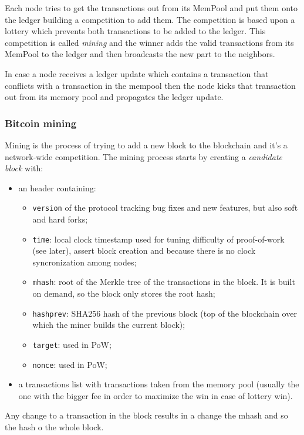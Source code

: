 Each node tries to get the transactions out from its MemPool and put them onto the ledger building a competition to add them.
The competition is based upon a lottery which prevents both transactions to be added to the ledger.
This competition is called \emph{mining} and the winner adds the valid transactions from its MemPool to the ledger and then broadcasts the new part to the neighbors. 

In case a node receives a ledger update which contains a transaction that conflicts with a transaction in the mempool then the node kicks that transaction out from its memory pool and propagates the ledger update.

\subsubsection{Bitcoin mining}
Mining is the process of trying to add a new block to the blockchain and it's a network-wide competition.
The mining process starts by creating a \emph{candidate block} with:
\begin{itemize}
    \item an header containing:
    \begin{itemize}
        \item \verb|version| of the protocol tracking bug fixes and new features, but also soft and hard forks;
        
        \item \verb|time|: local clock timestamp used for tuning difficulty of proof-of-work (see later), assert block creation and because there is no clock syncronization among nodes;
        
        \item \verb|mhash|: root of the Merkle tree of the transactions in the block.
        It is built on demand, so the block only stores the root hash;

        \item \verb|hashprev|: SHA256 hash of the previous block (top of the blockchain over which the miner builds the current block);

        \item \verb|target|: used in PoW;

        \item \verb|nonce|: used in PoW;
    \end{itemize}

    \item a transactions list with transactions taken from the memory pool (usually the one with the bigger fee in order to maximize the win in case of lottery win).
\end{itemize}
Any change to a transaction in the block results in a change the mhash and so the hash o the whole block.

